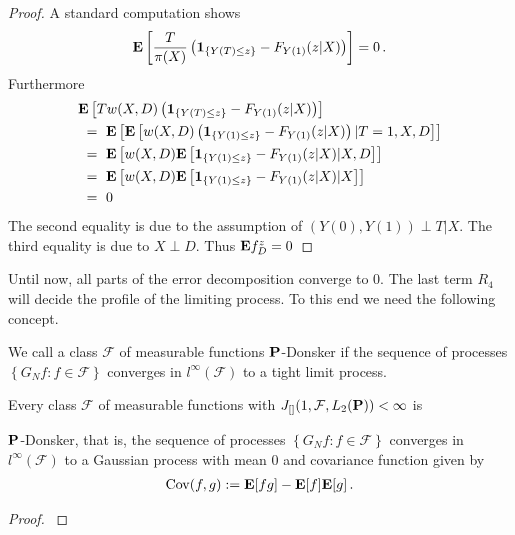 \begin{proof}
  A standard computation shows
  \begin{gather}
    \E
    \left[ 
    \frac{T}{\pi(X)}
    \left( 
    \mathbf{1}_{\left\{ Y(T) \le z \right\}}
    -
  F_{Y(1)}(z|X)
    \right)
    \right]
    =0
    \,.
  \end{gather}
  Furthermore
  \begin{align*}
    &
    \E
    \left[ 
      Tw(X,D)
    \left( 
    \mathbf{1}_{\left\{ Y(T) \le z \right\}}
    -
  F_{Y(1)}(z|X)
    \right)
    \right]
    \\
    &
    \ 
    =
    \ 
    \E
    \left[ 
      \E
      \left[ 
      w(X,D)
      \left( 
    \mathbf{1}_{\left\{ Y(1) \le z \right\}}
    -
  F_{Y(1)}(z|X)
      \right)
  |T=1,X,D
      \right]
    \right]
    \\
    &
    \ 
    =
    \ 
    \E
    \left[ 
      w(X,D)
      \E
      \left[ 
    \mathbf{1}_{\left\{ Y(1) \le z \right\}}
    -
  F_{Y(1)}(z|X)
  |X,D
      \right]
    \right]
    \\
    &
    \ 
    =
    \ 
    \E
    \left[ 
      w(X,D)
      \E
      \left[ 
    \mathbf{1}_{\left\{ Y(1) \le z \right\}}
    -
  F_{Y(1)}(z|X)
  |X
      \right]
    \right]
    \\
    &
    \ 
    =
    \ 
    0
  \end{align*}
  The second equality is due to the assumption of 
  $(Y(0),Y(1))\perp T |X$.
  The third equality is due to $X\perp D$.
  Thus
  $
    \E
    f_D^z
    =
    0
  $
\end{proof}

Until now, all parts of the error decomposition converge to 0.
The last term $R_4$ will decide the profile of the limiting process.
To this end we need the following concept.
\begin{definition}
  We call a class 
  $\mathcal{F}$ of measurable functions 
$\P$-Donsker
if the sequence of processes 
$\left\{ G_N f \colon f\in\mathcal{F}\right\}$
converges in
$l^\infty(\mathcal{F})$
to a tight limit process.
\end{definition}

\begin{theorem}
  Every class $\mathcal{F}$ of measurable functions 
  with
  $
    J
    _{[]}
    (
    1
    ,
    \mathcal{F}
    ,
    L_2(\P)
    )
    <\infty
  $
  is

  $\P$-Donsker, that is,
  the sequence of processes 
$\left\{ G_N f \colon f\in\mathcal{F}\right\}$
  converges 
  in
$l^\infty(\mathcal{F})$
to a Gaussian process with mean 0 and covariance function given by
\begin{gather}
  \mathrm{Cov}(f,g)
  :=
  \E[fg]-\E[f]\E[g]
  \,.
\end{gather}
\end{theorem}
\begin{proof}
  \cite[Theorem~19.5]{Vaart2000}
\end{proof}



